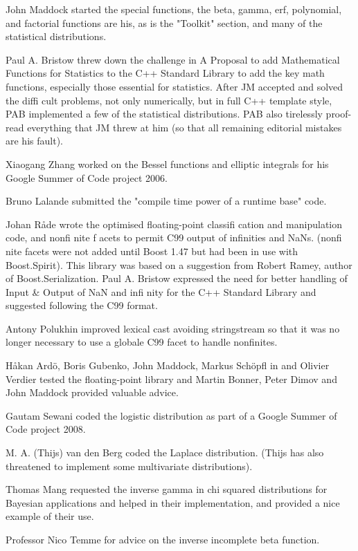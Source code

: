 \vpara
John Maddock started the special functions, the beta, gamma, erf, polynomial, and factorial functions are his, as is the "Toolkit" section, and many of the statistical distributions.

\vpara
Paul A. Bristow threw down the challenge in A Proposal to add Mathematical Functions for Statistics to the C++ Standard Library to add the key math functions, especially those essential for statistics. After JM accepted and solved the diffi cult problems, not only numerically, but in full C++ template style, PAB implemented a few of the statistical distributions. PAB also tirelessly proof-read everything that JM threw at him (so that all remaining editorial mistakes are his fault).

\vpara
Xiaogang Zhang worked on the Bessel functions and elliptic integrals for his Google Summer of Code project 2006.

\vpara
Bruno Lalande submitted the "compile time power of a runtime base" code.

\vpara
Johan Råde wrote the optimised floating-point classifi cation and manipulation code, and nonfi nite f acets to permit C99 output of infinities and NaNs. (nonfi nite facets were not added until Boost 1.47 but had been in use with Boost.Spirit). This library was based on a suggestion from Robert Ramey, author of Boost.Serialization. Paul A. Bristow expressed the need for better handling of Input \& Output of NaN and infi nity for the C++ Standard Library  and suggested following the C99 format.

\vpara
Antony Polukhin improved lexical cast avoiding stringstream so that it was no longer necessary to use a globale C99 facet to handle nonfinites.

\vpara
Håkan Ardö, Boris Gubenko, John Maddock, Markus Schöpfl in and Olivier Verdier tested the floating-point library and Martin Bonner, Peter Dimov and John Maddock provided valuable advice.

\vpara
Gautam Sewani coded the logistic distribution as part of a Google Summer of Code project 2008.

\vpara
M. A. (Thijs) van den Berg coded the Laplace distribution. (Thijs has also threatened to implement some multivariate distributions).

\vpara
Thomas Mang requested the inverse gamma in chi squared distributions for Bayesian applications and helped in their implementation, and provided a nice example of their use.

\vpara
Professor Nico Temme for advice on the inverse incomplete beta function.

